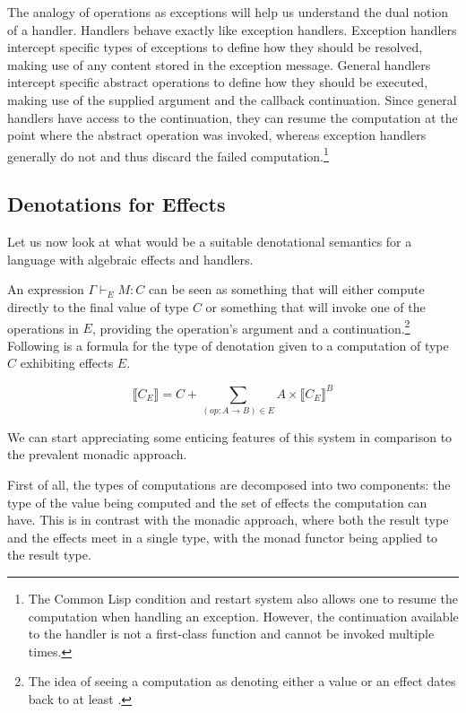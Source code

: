 \documentclass{article}
\newcommand{\sem}[1]{\llbracket #1 \rrbracket}
\begin{document}
The analogy of operations as exceptions will help us understand the dual
notion of a handler. Handlers behave exactly like exception
handlers. Exception handlers intercept specific types of exceptions to define
how they should be resolved, making use of any content stored in the exception
message. General handlers intercept specific abstract operations to define how
they should be executed, making use of the supplied argument and the callback
continuation. Since general handlers have access to the continuation, they can
resume the computation at the point where the abstract operation was invoked,
whereas exception handlers generally do not and thus discard the failed
computation.\footnote{The Common Lisp condition and restart system also allows
  one to resume the computation when handling an exception. However, the
  continuation available to the handler is not a first-class function and
  cannot be invoked multiple times.}

\subsection{Denotations for Effects}
\label{ssec:denotations-for-effects}

Let us now look at what would be a suitable denotational semantics for a
language with algebraic effects and handlers.

An expression $\Gamma \vdash_E M : C$ can be seen as something that will
either compute directly to the final value of type $C$ or something that will
invoke one of the operations in $E$, providing the operation's argument and a
continuation.\footnote{The idea of seeing a computation as denoting either a
  value or an effect dates back to at least \citet{cartwright1994extensible}.}
Following is a formula for the type of denotation given to a computation of type
$C$ exhibiting effects $E$. \citep{bauer2012programming}
\citep{kiselyov2013extensible}

$$
\sem{C_E} = C + \sum_{(op : A \to B) \in E} A \times \sem{C_E}^B
$$

We can start appreciating some enticing features of this system in comparison
to the prevalent monadic approach.

First of all, the types of computations are decomposed into two components:
the type of the value being computed and the set of effects the computation
can have. This is in contrast with the monadic approach, where both the result
type and the effects meet in a single type, with the monad functor being
applied to the result type.
\end{document}
